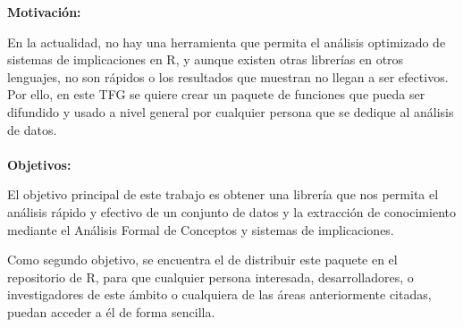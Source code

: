 \textbf{Motivaci\'on:}

En la actualidad, no hay una herramienta que permita el an\'alisis 
optimizado de sistemas de implicaciones en R, y aunque existen otras 
librer\'ias en otros lenguajes, no son r\'apidos o los resultados que 
muestran no llegan a ser efectivos.
Por ello, en este TFG se quiere crear un paquete de funciones que pueda 
ser difundido y usado a nivel general por cualquier persona que se dedique 
al an\'alisis de datos.
\\
\\


\textbf{Objetivos:}

El objetivo principal de este trabajo es obtener una librer\'ia que 
nos permita el an\'alisis r\'apido y efectivo de un conjunto de datos 
y la extracci\'on de conocimiento mediante el An\'alisis Formal de Conceptos y sistemas de implicaciones.

Como segundo objetivo, se encuentra el de distribuir este paquete en el repositorio 
de R, para que cualquier persona interesada, desarrolladores, o investigadores de este \'ambito o cualquiera 
de las \'areas anteriormente citadas, puedan acceder a \'el de forma sencilla.
\\
\\



\thispagestyle{empty}
\mbox{}
